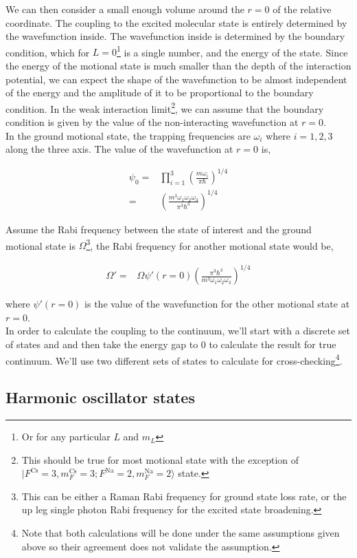 \documentclass[10pt,fleqn]{article}
\newcommand{\eqar}[1]
{
  \begin{align*}
    #1
  \end{align*}
}
\newcommand{\paren}[1]{{\left({#1}\right)}}
\begin{document}
We can then consider a small enough volume around the $r=0$ of the relative coordinate.
The coupling to the excited molecular state is entirely determined by the wavefunction
inside. The wavefunction inside is determined by the boundary condition,
which for $L=0$\footnote{Or for any particular $L$ and $m_L$} is a single number,
and the energy of the state. Since the energy of the motional state is much smaller than
the depth of the interaction potential, we can expect the shape of the wavefunction
to be almost independent of the energy and the amplitude of it to be proportional to
the boundary condition. In the weak interaction limit\footnote{This should be true for most
  motional state with the exception of $|F^{\mathrm{Cs}}\!=\!3, m_{F}^{\mathrm{Cs}}\!=\!3; F^{\mathrm{Na}}\!=\!2, m_{F}^{\mathrm{Na}}\!=\!2\rangle$ state.},
we can assume that the boundary condition is given by the value of
the non-interacting wavefunction at $r=0$.\\

In the ground motional state, the trapping frequencies are $\omega_i$ where $i=1,2,3$
along the three axis. The value of the wavefunction at $r=0$ is,

\eqar{
  \psi_0=&\prod_{i=1}^{3}\paren{\frac{m\omega_i}{\pi\hbar}}^{1/4}\\
  =&\paren{\frac{m^3\omega_1\omega_2\omega_3}{\pi^3\hbar^3}}^{1/4}
}

Assume the Rabi frequency between the state of interest and the ground motional state
is $\Omega$\footnote{This can be either a Raman Rabi frequency for ground state loss rate,
  or the up leg single photon Rabi frequency for the excited state broadening.},
the Rabi frequency for another motional state would be,

\eqar{
  \Omega'=&\Omega\psi'(r=0)\paren{\frac{\pi^3\hbar^3}{m^3\omega_1\omega_2\omega_3}}^{1/4}
}
where $\psi'(r=0)$ is the value of the wavefunction for the other motional state at $r=0$.\\

In order to calculate the coupling to the continuum, we'll start with a discrete set of states
and and then take the energy gap to $0$ to calculate the result for true continuum.
We'll use two different sets of states to calculate for cross-checking\footnote{
  Note that both calculations will be done under the same assumptions given above so their
  agreement does not validate the assumption.}.

\subsection{Harmonic oscillator states}
\end{document}
